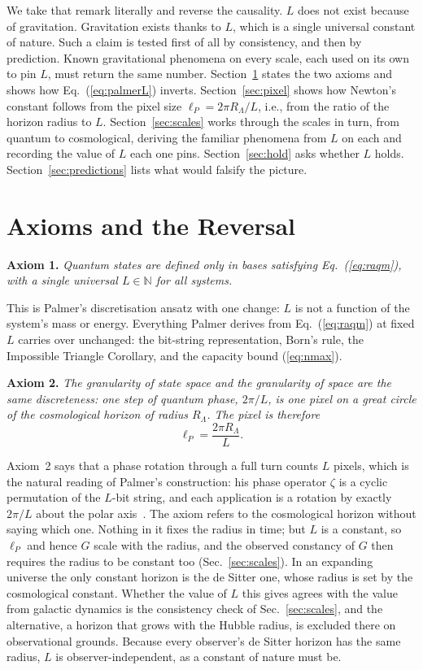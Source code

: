 \documentclass[aps,prd,twocolumn,superscriptaddress,nofootinbib,showkeys]{revtex4-2}
\begin{document}
We take that remark literally and reverse the causality. $L$ does not exist because of gravitation. Gravitation exists thanks to $L$, which is a single universal constant of nature. Such a claim is tested first of all by consistency, and then by prediction. Known gravitational phenomena on every scale, each used on its own to pin $L$, must return the same number. Section~\ref{sec:axioms} states the two axioms and shows how Eq.~(\ref{eq:palmerL}) inverts. Section~\ref{sec:pixel} shows how Newton's constant follows from the pixel size $\ell_P = 2\pi R_\Lambda/L$, i.e., from the ratio of the horizon radius to $L$. Section~\ref{sec:scales} works through the scales in turn, from quantum to cosmological, deriving the familiar phenomena from $L$ on each and recording the value of $L$ each one pins. Section~\ref{sec:hold} asks whether $L$ holds. Section~\ref{sec:predictions} lists what would falsify the picture.

\section{Axioms and the Reversal}
\label{sec:axioms}

\textbf{Axiom 1.} \emph{Quantum states are defined only in bases satisfying Eq.~(\ref{eq:raqm}), with a single universal $L\in\mathbb{N}$ for all systems.}

This is Palmer's discretisation ansatz with one change: $L$ is not a function of the system's mass or energy. Everything Palmer derives from Eq.~(\ref{eq:raqm}) at fixed $L$ carries over unchanged: the bit-string representation, Born's rule, the Impossible Triangle Corollary, and the capacity bound (\ref{eq:nmax}).

\textbf{Axiom 2.} \emph{The granularity of state space and the granularity of space are the same discreteness: one step of quantum phase, $2\pi/L$, is one pixel on a great circle of the cosmological horizon of radius $R_\Lambda$. The pixel is therefore}
\begin{equation}
\ell_P = \frac{2\pi R_\Lambda}{L} .
\label{eq:ident}
\end{equation}

Axiom~2 says that a phase rotation through a full turn counts $L$ pixels, which is the natural reading of Palmer's construction: his phase operator $\zeta$ is a cyclic permutation of the $L$-bit string, and each application is a rotation by exactly $2\pi/L$ about the polar axis~\cite{palmer2026}. The axiom refers to the cosmological horizon without saying which one. Nothing in it fixes the radius in time; but $L$ is a constant, so $\ell_P$ and hence $G$ scale with the radius, and the observed constancy of $G$ then requires the radius to be constant too (Sec.~\ref{sec:scales}). In an expanding universe the only constant horizon is the de Sitter one, whose radius is set by the cosmological constant. Whether the value of $L$ this gives agrees with the value from galactic dynamics is the consistency check of Sec.~\ref{sec:scales}, and the alternative, a horizon that grows with the Hubble radius, is excluded there on observational grounds. Because every observer's de Sitter horizon has the same radius, $L$ is observer-independent, as a constant of nature must be.
\end{document}
